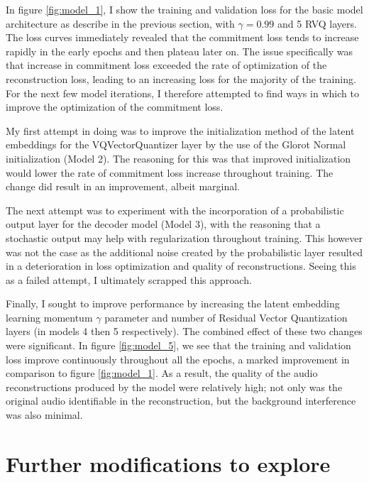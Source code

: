 \documentclass[11pt,a4paper]{article}
\begin{document}
In figure \ref{fig:model_1}, I show the training and validation loss for the
basic model architecture as describe in the previous section, with $\gamma = 0.99$
and 5 RVQ layers. The loss curves immediately revealed that the commitment
loss tends to increase rapidly in the early epochs and then plateau later on.
The issue specifically was that increase in commitment loss exceeded the rate
of optimization of the reconstruction loss, leading to an increasing loss for the
majority of the training. For the next few model iterations, I therefore attempted
to find ways in which to improve the optimization of the commitment loss.

My first attempt in doing was to improve the initialization method of
the latent embeddings for the VQVectorQuantizer layer by the use of the
Glorot Normal initialization (Model 2). The reasoning for this was that improved
initialization would lower the rate of commitment loss increase
throughout training. The change did result in an improvement, albeit marginal.

The next attempt was to experiment with the incorporation of a probabilistic
output layer for the decoder model (Model 3), with the reasoning that a stochastic output
may help with regularization throughout training. This however was not the case
as the additional noise created by the probabilistic layer resulted in a deterioration
in loss optimization and quality of reconstructions. Seeing this as a failed attempt,
I ultimately scrapped this approach.

Finally, I sought to improve performance by increasing the latent embedding learning momentum $\gamma$
parameter and number of Residual Vector Quantization layers (in models 4 then 5 respectively).
The combined effect of these two changes were significant. In
figure \ref{fig:model_5}, we see that the training and validation
loss improve continuously throughout all the epochs, a marked improvement
in comparison to figure \ref{fig:model_1}. As a result, the quality of the
audio reconstructions produced by the model were relatively high; not only
was the original audio identifiable in the reconstruction, but the background
interference was also minimal.

\section{Further modifications to explore}
\end{document}

